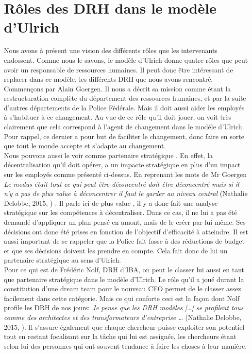 \section{Rôles des DRH dans le modèle d'Ulrich}

Nous avons à présent une vision des différents rôles que les intervenants endossent. Comme nous le savons, le modèle d'Ulrich donne quatre rôles que peut avoir un responsable de ressources humaines. Il peut donc être intéressant de replacer dans ce modèle, les différents DRH que nous avons rencontré. \\

Commençons par Alain Goergen. Il nous a décrit sa mission comme étant la restructuration complète du département des ressources humaines, et par la suite d'autres départements de la Police Fédérale. Mais il doit aussi aider les employés à s'habituer à ce changement. Au vue de ce rôle qu'il doit jouer, on voit très clairement que cela correspond à l'\og agent de changement \fg{} dans le modèle d'Ulrich. Pour rappel, ce dernier a pour but de faciliter le changement, donc faire en sorte que tout le monde accepte et s'adapte au changement.\\

Nous pouvons aussi le voir comme \og partenaire stratégique \fg{}. En effet, la décentralisation qu'il doit opérer, a un impacte stratégique en plus d'un impact sur les employés comme présenté ci-dessus. En reprenant les mots de Mr Goergen \textit{\og Le modus était tout ce qui peut être déconcentré doit être déconcentré mais si il n’y a pas de plus value à déconcentrer il faut le garder au niveau central \fg{}} (Nathalie Delobbe, 2015, \cite{tableronde}) . Il parle ici de \og plus-value \fg{}, il y a donc fait une analyse stratégique sur les compétences à décentraliser. Dans ce cas, il ne lui a pas été demandé d'appliquer un plan pensé en amont, mais de le créer par lui même. Ses décisions ont donc été prises en fonction de l'objectif d'efficacité à atteindre. Il est aussi important de se rappeler que la Police fait fasse à des réductions de budget et que ses décisions doivent les prendre en compte. Cela fait donc de lui un \og partenaire stratégique \fg{} au sens d'Ulrich.\\   

Pour ce qui est de Frédéric Nolf, DRH d'IBA, on peut le classer lui aussi en tant que \og{}partenaire stratégique\fg{} dans le modèle d'Ulrich. Le rôle qu'il a joué durant la constitution d'une \og{}dream team\fg{} pour le nouveau CEO permet de le classer assez facilement dans cette catégorie. Mais ce qui conforte ceci est la façon dont Nolf profile les DRH de nos jours: \og{} \textit{Je pense que les DRH modèles [\ldots] se profilent tous comme des architectes et des transformateurs d’entreprise \ldots} \fg{} (Nathalie Delobbe, 2015, \cite{tableronde}). Il s'assure également que chaque chercheur puisse exploiter son potentiel tout en restant focalisant sur la tâche qui lui est assignée, les chercheurs étant selon lui des personnes qui ont souvent tendance à faire les choses à leur manière. \newline


